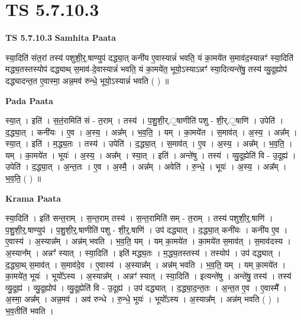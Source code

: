 \documentclass[17pt]{extarticle}
\begin{document}
\section{ TS 5.7.10.3 }

\textbf{TS 5.7.10.3 } \newline
\textbf{Samhita Paata} \newline

स्या॒दिति॑ संत॒रां तस्य॑ पशुशी॒र्॒.षाण्युप॑ दद्ध्या॒त् कनी॑य ए॒वास्यान्नं॑ भवति॒ यं का॒मये॑त स॒माव॑द॒स्यान्नꣳ॑ स्या॒दिति॑ मद्ध्य॒तस्तस्योप॑ दद्ध्याथ् स॒माव॑-दे॒वास्यान्नं॑ भवति॒ यं का॒मये॑त॒ भूयो॒ऽस्याऽन्नꣳ॑ स्या॒दित्यन्ते॑षु॒ तस्य॑ व्यु॒दूह्योप॑ दद्ध्यादन्त॒त ए॒वास्मा॒ अन्न॒मव॑ रुन्धे॒ भूयो॒ऽस्यान्नं॑ भवति ( ) ॥ \newline

\textbf{Pada Paata} \newline

स्या॒त् । इति॑ । स॒तं॒रामिति॑ सं - त॒राम् । तस्य॑ । प॒शु॒शी॒र्.॒षाणीति॑ पशु - शी॒र्.॒षाणि॑ । उपेति॑ । द॒द्ध्या॒त् । कनी॑यः । ए॒व । अ॒स्य॒ । अन्न᳚म् । भ॒व॒ति॒ । यम् । का॒मये॑त । स॒माव॑त् । अ॒स्य॒ । अन्न᳚म् । स्या॒त् । इति॑ । म॒द्ध्य॒तः । तस्य॑ । उपेति॑ । द॒द्ध्या॒त् । स॒माव॑त् । ए॒व । अ॒स्य॒ । अन्न᳚म् । भ॒व॒ति॒ । यम् । का॒मये॑त । भूयः॑ । अ॒स्य॒ । अन्न᳚म् । स्या॒त् । इति॑ । अन्ते॑षु । तस्य॑ । व्यु॒दूह्येति॑ वि - उ॒दूह्य॑ । उपेति॑ । द॒द्ध्या॒त् । अ॒न्त॒तः । ए॒व । अ॒स्मै॒ । अन्न᳚म् । अवेति॑ । रु॒न्धे॒ । भूयः॑ । अ॒स्य॒ । अन्न᳚म् । भ॒व॒ति॒ ( ) ॥  \newline


\textbf{Krama Paata} \newline

स्या॒दिति॑ । इति॑ सन्त॒राम् । स॒न्त॒राम् तस्य॑ । स॒न्त॒रामिति॑ सम् - त॒राम् । तस्य॑ पशुशी॒र्॒.षाणि॑ । प॒शु॒शी॒र्॒.षाण्युप॑ । प॒शु॒शी॒र्॒.षाणीति॑ पशु - शी॒र्॒.षाणि॑ । उप॑ दद्ध्यात् । द॒द्ध्या॒त् कनी॑यः । कनी॑य ए॒व । ए॒वास्य॑ । अ॒स्यान्न᳚म् । अन्न॑म् भवति । भ॒व॒ति॒ यम् । यम् का॒मये॑त । का॒मये॑त स॒माव॑त् । स॒माव॑दस्य । अ॒स्यान᳚म् । अन्नꣳ᳚ स्यात् । स्या॒दिति॑ । इति॑ मद्ध्य॒तः । म॒द्ध्य॒तस्तस्य॑ । तस्योप॑ । उप॑ दद्ध्यात् । द॒द्ध्या॒थ् स॒माव॑त् । स॒माव॑दे॒व । ए॒वास्य॑ । अ॒स्यान्न᳚म् । अन्न॑म् भवति । भ॒व॒ति॒ यम् । यम् का॒मये॑त । का॒मये॑त॒ भूयः॑ । भूयो᳚ऽस्य । अ॒स्यान्न᳚म् । अन्नꣳ॑ स्यात् । स्या॒दिति॑ । इत्यन्ते॑षु । अन्ते॑षु॒ तस्य॑ । तस्य॑ व्यु॒दूह्य॑ । व्यु॒दूह्योप॑ । व्यु॒दूह्येति॑ वि - उ॒दूह्य॑ । उप॑ दद्ध्यात् । द॒द्ध्या॒द॒न्त॒तः । अ॒न्त॒त ए॒व । ए॒वास्मै᳚ । अ॒स्मा॒ अन्न᳚म् । अन्न॒मव॑ । अव॑ रुन्धे । रु॒न्धे॒ भूयः॑ । भूयो᳚ऽस्य । अ॒स्यान्न᳚म् । अन्न॑म् भवति ( ) । भ॒व॒तीति॑ भवति । \newline
\end{document}
